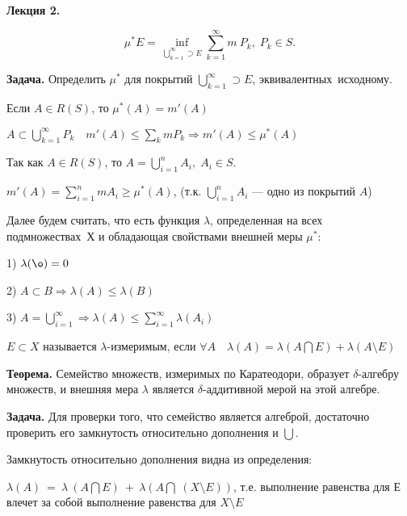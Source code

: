 

\begin{center}
\textbf{Лекция 2.}
\end{center}

$$\mu ^* E = \inf\limits_{\bigcup_{k=1}^{\infty} \supset E}
\sum\limits_{k=1}^{\infty} m\:P_k, \; P_k \in S.$$

\textbf{Задача.} \quad Определить $\mu^*$ для покрытий
$\bigcup_{k=1}^{\infty} \supset E$, эквивалентных~исходному.

Если $A \in R(S)$, то $\mu^*(A) = m'(A)$

$A \subset \bigcup_{k=1}^{\infty}P_k \quad m'(A)\leqslant \sum_k
mP_k \Rightarrow m'(A) \leqslant \mu^*(A)$

Так как $A \in R(S)$, то $A = \bigcup_{i=1}^n A_i, \; A_i \in S.$

$m'(A) = \sum_{i=1}^n mA_i \geqslant \mu^*(A)$, (т.к.
$\bigcup_{i=1}^n A_i$ --- одно из покрытий $A$)

Далее будем считать, что есть функция $\lambda$, определенная на
всех подмножествах~Х и обладающая свойствами внешней меры $\mu^*$:

1) $\lambda(\o) = 0$

2) $A \subset B \Rightarrow \lambda(A) \leqslant \lambda(B)$

3) $A = \bigcup_{i=1}^{\infty} \Rightarrow \lambda(A) \leqslant
\sum_{i=1}^{\infty} \lambda(A_i)$

$E \subset X$ называется $\lambda$-измеримым, если $\forall A
\quad \lambda(A) = \lambda(A \bigcap E) + \lambda(A \setminus E)$


\textbf{Теорема.} \quad Семейство множеств, измеримых по
Каратеодори, образует $\delta$-алгебру множеств, и внешняя мера
$\lambda$ является $\delta$-аддитивной мерой на этой алгебре.

\textbf{Задача.} \quad Для проверки того, что семейство является
алгеброй, достаточно проверить его замкнутость относительно
дополнения и $\bigcup$.

Замкнутость относительно дополнения видна из определения:

$\lambda (A)~=~\lambda~(A \bigcap E)~+~\lambda(A\bigcap\;
(X\setminus E))$, т.е. выполнение равенства для Е влечет за собой
выполнение равенства для $X \setminus E$









